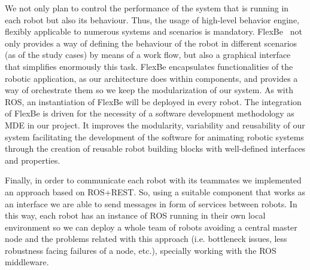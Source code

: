 We not only plan to control the performance of the system that is running in each robot but also its behaviour.
Thus, the usage of high-level behavior engine, flexibly applicable to numerous systems and scenarios is mandatory.
FlexBe~\cite{Schillinger2016} not only provides a way of defining the behaviour of the robot in different scenarios (as of the study cases) by means of a work flow, but also a graphical interface that simplifies enormously this task.
FlexBe encapsulates functionalities of the robotic application, as our architecture does within components, and provides a way of orchestrate them so we keep the modularization of our system.
As with ROS, an instantiation of FlexBe will be deployed in every robot.
The integration of FlexBe is driven for the necessity of a software development methodology as MDE in our project.
It improves the modularity, variability and reusability of our system facilitating the development of the software for animating robotic systems through the creation of reusable robot building blocks with well-defined interfaces and properties.

Finally, in order to communicate each robot with its teammates we implemented an approach based on ROS+REST.
So, using a suitable component that works as an interface we are able to send messages in form of services between robots.
In this way, each robot has an instance of ROS running in their own local environment so we can deploy a whole team of robots avoiding a central master node and the problems related with this approach (i.e. bottleneck issues, less robustness facing failures of a node, etc.), specially working with the ROS middleware.

